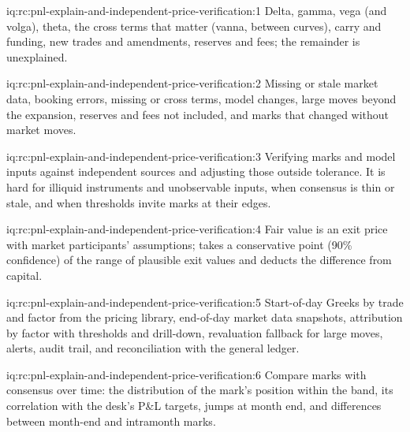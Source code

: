 \begin{solution}{iq:rc:pnl-explain-and-independent-price-verification:1}
Delta, gamma, vega (and volga), theta, the cross terms that matter (vanna,  between curves),
carry and funding, new trades and amendments, reserves and fees; the remainder is unexplained.
\end{solution}

\begin{solution}{iq:rc:pnl-explain-and-independent-price-verification:2}
Missing or stale market data, booking errors, missing  or cross terms, model changes,
large moves beyond the expansion, reserves and fees not included, and marks that changed without market
moves.
\end{solution}

\begin{solution}{iq:rc:pnl-explain-and-independent-price-verification:3}
Verifying marks and model inputs against independent sources and adjusting those outside tolerance. It is
hard for illiquid instruments and unobservable inputs, when consensus is thin or stale, and when thresholds
invite marks at their edges.
\end{solution}

\begin{solution}{iq:rc:pnl-explain-and-independent-price-verification:4}
Fair value is an exit price with market participants' assumptions;  takes a conservative
point (90\% confidence) of the range of plausible exit values and deducts the difference from capital.
\end{solution}

\begin{solution}{iq:rc:pnl-explain-and-independent-price-verification:5}
Start-of-day Greeks by trade and factor from the pricing library, end-of-day market data snapshots,
attribution by factor with thresholds and drill-down, revaluation fallback for large moves, alerts,
audit trail, and reconciliation with the general ledger.
\end{solution}

\begin{solution}{iq:rc:pnl-explain-and-independent-price-verification:6}
Compare marks with consensus over time: the distribution of the mark's position within the band, its
correlation with the desk's P\&L targets, jumps at month end, and differences between month-end and
intramonth marks.
\end{solution}
